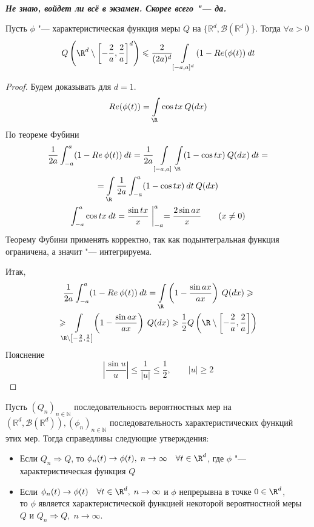 \documentclass[a4paper,reqno]{amsart}
\begin{document}
\\
\textbf{\emph{Не знаю, войдет ли всё в экзамен. Скорее всего "--- да.}}

    \begin{lemma} \label{lect12:lem5}
        Пусть $\phi$ "--- характеристическая функция меры $Q$ на $\{\mathbb{R}^d, \mathcal{B}(\mathbb{R}^d)\}$. Тогда $\forall a > 0$
        $$Q\left(\R^d \setminus \left[-\frac{2}{a}, \frac{2}{a}\right]^d\right) \leqslant \frac{2}{(2a)^d} \int\limits_{[-a, a]^d} (1 - Re(\phi(t)) \:dt$$
    \end{lemma}
    \begin{proof}
        Будем доказывать для $d = 1$.
        $$Re(\phi(t)) = \int\limits_\R \cos{tx}\:Q(dx)$$
        По теореме Фубини
        \begin{gather*}
            \frac{1}{2a} \int_{-a}^a (1 - Re\: \phi(t))\:dt = \frac{1}{2a} \int\limits_{[-a, a]} \int\limits_\R (1 - \cos{tx}) \:Q(dx) \:dt
            =\\= \int\limits_\R \frac{1}{2a} \int_{-a}^a (1 - \cos{tx})\: dt \:Q(dx)\\
            \int_{-a}^a \cos{tx} \:dt = \frac{\sin{tx}}{x} \biggm|_{-a}^a = \frac{2\sin{ax}}{x} \qquad (x \ne 0)
        \end{gather*}
        Теорему Фубини применять корректно, так как подынтегральная функция ограничена, а значит "--- интегрируема.

        Итак,
        \begin{multline*}
            \frac{1}{2a} \int_{-a}^a (1 - Re\:\phi(t))\: dt = \int\limits_\R \left(1 - \frac{\sin{ax}}{ax}\right) \:Q(dx) \geqslant\\\geqslant \!\!\!\!\int\limits_{\R \setminus \left[-\frac{2}{a}, \frac{2}{a}  \right]}\!\! \left(1 - \frac{\sin{ax}}{ax} \right)\:Q(dx) \geqslant \frac{1}{2} Q\left(\R\setminus\left[ -\frac{2}{a}, \frac{2}{a}\right]\right) 
        \end{multline*}
        Пояснение
        $$\left| \frac{\sin{u}}{u}\right| \leqslant \frac{1}{|u|} \leqslant \frac{1}{2}, \qquad |u| \geqslant2 $$
    \end{proof}
\begin{theorem} \label{lect12:th5}
    Пусть $(Q_n)_{n \in \mathbb{N}}$ последовательность вероятностных мер на $(\mathbb{R}^d, \mathcal{B}(\mathbb{R}^d)), (\phi_n)_{n\in \mathbb{N}}$ последовательность характеристических функций этих мер. Тогда справедливы следующие утверждения:
    \begin{itemize}
        \item Если $Q_n \Rightarrow Q$, то $\phi_n(t) \to \phi(t), \;  n \to \infty \quad \forall t \in \R^d$, где $\phi$ "--- характеристическая функция $Q$
        \item Если $\phi_n(t) \to \phi(t) \quad \forall t \in \R^d, \; n \to \infty$  и $\phi$ непрерывна в точке $0\in\R^d$,\\то $\phi$ является характеристической функцией некоторой вероятностной меры $Q$ и $Q_n \Rightarrow Q, \; n \to \infty$.
    \end{itemize}
\end{theorem}
\end{document}
